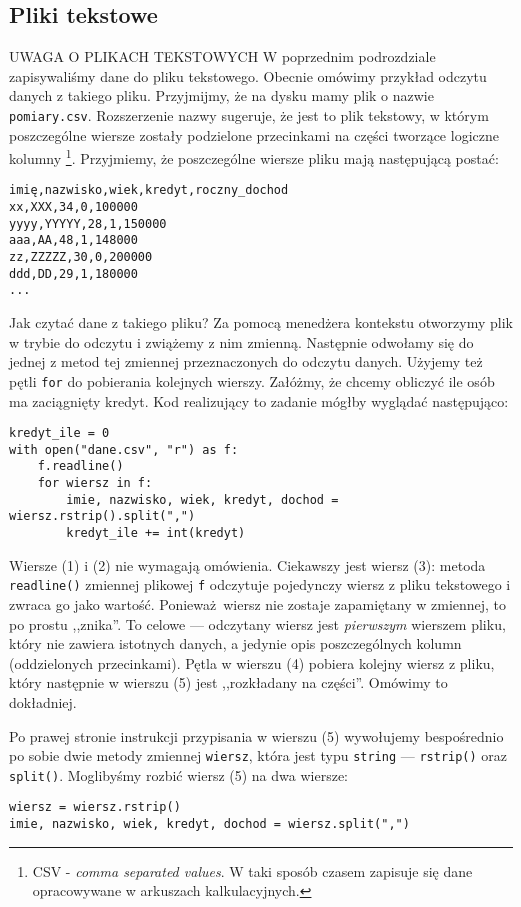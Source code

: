 \documentclass[a4paper]{article}
\begin{document}
\subsection{Pliki tekstowe}
UWAGA O PLIKACH TEKSTOWYCH
W poprzednim podrozdziale zapisywaliśmy dane do pliku tekstowego. Obecnie omówimy przykład odczytu danych z takiego pliku. Przyjmijmy, że na dysku mamy plik o nazwie \texttt{pomiary.csv}. Rozszerzenie nazwy sugeruje, że jest to plik tekstowy, w którym poszczególne wiersze zostały podzielone przecinkami na części tworzące logiczne kolumny \footnote{CSV - \emph{comma separated values}. W taki sposób czasem zapisuje się dane opracowywane w arkuszach kalkulacyjnych.}. Przyjmiemy, że poszczególne wiersze pliku mają następującą postać:
\lstset{numbers=none}
\begin{lstlisting}
imię,nazwisko,wiek,kredyt,roczny_dochod
xx,XXX,34,0,100000
yyyy,YYYYY,28,1,150000
aaa,AA,48,1,148000
zz,ZZZZZ,30,0,200000
ddd,DD,29,1,180000
...
\end{lstlisting}

Jak czytać dane z takiego pliku? Za pomocą menedżera kontekstu otworzymy plik w trybie do odczytu i zwiążemy z nim zmienną. Następnie odwołamy się do jednej z metod tej zmiennej przeznaczonych do odczytu danych. Użyjemy też pętli \lstinline|for| do pobierania kolejnych wierszy. Załóżmy, że chcemy obliczyć ile osób ma zaciągnięty kredyt. Kod realizujący to zadanie mógłby wyglądać następująco:

\lstset{numbers=left}
\begin{lstlisting}
kredyt_ile = 0
with open("dane.csv", "r") as f:
    f.readline()
    for wiersz in f:
        imie, nazwisko, wiek, kredyt, dochod = wiersz.rstrip().split(",")
        kredyt_ile += int(kredyt)
\end{lstlisting}

Wiersze (1) i (2) nie wymagają omówienia. Ciekawszy jest wiersz (3): metoda \lstinline|readline()| zmiennej plikowej \texttt{f} odczytuje pojedynczy wiersz z pliku tekstowego i zwraca go jako wartość. Ponieważ wiersz nie zostaje zapamiętany w zmiennej, to po prostu ,,znika''. To celowe --- odczytany wiersz jest \emph{pierwszym} wierszem pliku, który nie zawiera istotnych danych, a jedynie opis poszczególnych kolumn (oddzielonych przecinkami). Pętla w wierszu (4) pobiera kolejny wiersz z pliku, który następnie w wierszu (5) jest ,,rozkładany na części''. Omówimy to dokładniej.

Po prawej stronie instrukcji przypisania w wierszu (5) wywołujemy bespośrednio po sobie dwie metody zmiennej \texttt{wiersz}, która jest typu \lstinline|string| --- \lstinline|rstrip()| oraz \lstinline|split()|. Moglibyśmy rozbić wiersz (5) na dwa wiersze:
\lstset{numbers=none}
\begin{lstlisting}
wiersz = wiersz.rstrip()
imie, nazwisko, wiek, kredyt, dochod = wiersz.split(",")
\end{lstlisting}
\end{document}
